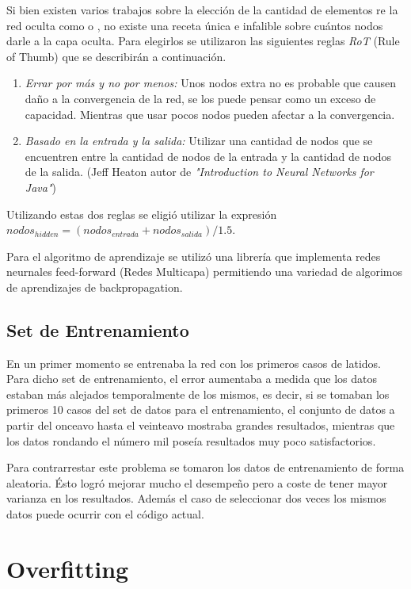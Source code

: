 \documentclass[conference]{IEEEtran}
\theoremstyle{definition}
\begin{document}
Si bien existen varios trabajos sobre la elección de la cantidad de elementos re la red oculta como \cite{SIZE1} o \cite{SIZE2}, no existe una receta única e infalible sobre cuántos nodos darle a la capa oculta. Para elegirlos se utilizaron las siguientes reglas \textit{RoT} (Rule of Thumb) que se describirán a continuación.

\begin{enumerate}
	\item \textit{Errar por más y no por menos:} Unos nodos extra no es probable que causen daño a la convergencia de la red, se los puede pensar como un exceso de capacidad. Mientras que usar pocos nodos pueden afectar a la convergencia. 
	\item \textit{Basado en la entrada y la salida:} Utilizar una cantidad de nodos que se encuentren entre la cantidad de nodos de la entrada y la cantidad de nodos de la salida. (Jeff Heaton autor de \textit{"Introduction to Neural Networks for Java"})
\end{enumerate}

Utilizando estas dos reglas se eligió utilizar la expresión \( nodos_{hidden} = (nodos_{entrada} + nodos_{salida})/1.5\).

Para el algoritmo de aprendizaje se utilizó una librería \cite{NIMBLENET} que implementa redes neurnales feed-forward (Redes Multicapa) permitiendo una variedad de algorimos de aprendizajes de backpropagation.

\subsection{Set de Entrenamiento}

En un primer momento se entrenaba la red con los primeros casos de latidos. Para dicho set de entrenamiento, el error aumentaba a medida que los datos estaban más alejados temporalmente de los mismos, es decir, si se tomaban los primeros 10 casos del set de datos para el entrenamiento, el conjunto de datos a partir del onceavo hasta el veinteavo mostraba grandes resultados, mientras que los datos rondando el número mil poseía resultados muy poco satisfactorios.

Para contrarrestar este problema se tomaron los datos de entrenamiento de forma aleatoria. Ésto logró mejorar mucho el desempeño pero a coste de tener mayor varianza en los resultados. Además el caso de seleccionar dos veces los mismos datos puede ocurrir con el código actual.

\section{Overfitting}
\end{document}
